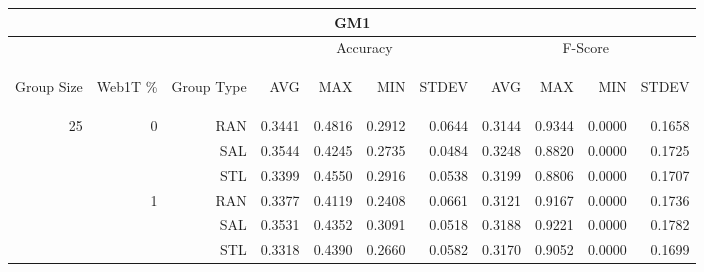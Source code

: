 \begin{center}
\begin{table}[htbp]
\begin{tabular}{ | r | r | r | r | r | r | r | r | r | r | r |}
\hline
\multicolumn{11}{|c|}{GM1}\\
\hline
 & & & \multicolumn{4}{|c|}{Accuracy} & \multicolumn{4}{|c|}{F-Score}\\ \cline{4-11}
\begin{sideways}Group Size\end{sideways} & \begin{sideways}Web1T \%\end{sideways} & \begin{sideways}Group Type\end{sideways} & \begin{sideways}AVG\end{sideways} & \begin{sideways}MAX\end{sideways} & \begin{sideways}MIN\end{sideways} & \begin{sideways}STDEV\end{sideways} & \begin{sideways}AVG\end{sideways} & \begin{sideways}MAX\end{sideways} & \begin{sideways}MIN\end{sideways} & \begin{sideways}STDEV\end{sideways}\\
\hline
\multirow{18}{*}{25}
 & \multirow{3}{*}{0} & RAN & 0.3441 & 0.4816 & 0.2912 & 0.0644 & 0.3144 & 0.9344 & 0.0000 & 0.1658\\ \cline{3-11}
 &   & SAL & 0.3544 & 0.4245 & 0.2735 & 0.0484 & 0.3248 & 0.8820 & 0.0000 & 0.1725\\ \cline{3-11}
 &   & STL & 0.3399 & 0.4550 & 0.2916 & 0.0538 & 0.3199 & 0.8806 & 0.0000 & 0.1707\\ \cline{2-11}
 & \multirow{3}{*}{1} & RAN & 0.3377 & 0.4119 & 0.2408 & 0.0661 & 0.3121 & 0.9167 & 0.0000 & 0.1736\\ \cline{3-11}
 &   & SAL & 0.3531 & 0.4352 & 0.3091 & 0.0518 & 0.3188 & 0.9221 & 0.0000 & 0.1782\\ \cline{3-11}
 &   & STL & 0.3318 & 0.4390 & 0.2660 & 0.0582 & 0.3170 & 0.9052 & 0.0000 & 0.1699\\ \cline{2-11}

\end{tabular}
\end{table}
\end{center}
